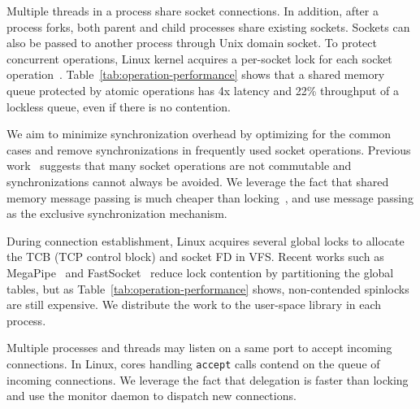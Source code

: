 Multiple threads in a process share socket connections. In addition, after a process forks, both parent and child processes share existing sockets. Sockets can also be passed to another process through Unix domain socket. To protect concurrent operations, Linux kernel acquires a per-socket lock for each socket operation~\cite{boyd2010analysis,han2012megapipe,lin2016scalable}. Table~\ref{tab:operation-performance} shows that a shared memory queue protected by atomic operations has 4x latency and 22\% throughput of a lockless queue, even if there is no contention.

We aim to minimize synchronization overhead by optimizing for the common cases and remove synchronizations in frequently used socket operations.
Previous work~\cite{boyd2010analysis,clements2015scalable} suggests that many socket operations are not commutable and synchronizations cannot always be avoided.
We leverage the fact that shared memory message passing is much cheaper than locking~\cite{roghanchi2017ffwd}, and use message passing as the exclusive synchronization mechanism.

During connection establishment, Linux acquires several global locks to allocate the TCB (TCP control block) and socket FD in VFS.
Recent works such as MegaPipe~\cite{han2012megapipe} and FastSocket~\cite{lin2016scalable} reduce lock contention by partitioning the global tables, but as Table~\ref{tab:operation-performance} shows, non-contended spinlocks are still expensive.
We distribute the work to the user-space library \libipc{} in each process.

Multiple processes and threads may listen on a same port to accept incoming connections.
In Linux, cores handling \texttt{accept} calls contend on the queue of incoming connections.
We leverage the fact that delegation is faster than locking~\cite{roghanchi2017ffwd} and use the monitor daemon to dispatch new connections.


